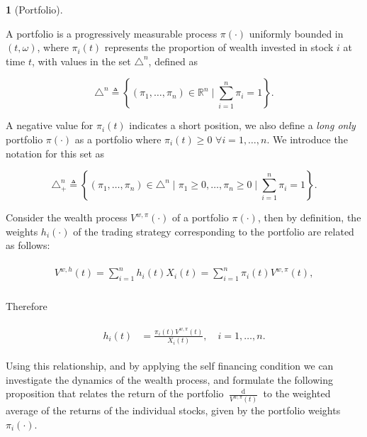 \documentclass[british]{amsart} \usepackage{lmodern}
\numberwithin{equation}{section} \numberwithin{figure}{section}
\theoremstyle{plain} \newtheorem{thm}{\protect\theoremname}[section]
\theoremstyle{definition} \newtheorem{defn}[thm]{\protect\definitionname}
\theoremstyle{plain} \newtheorem{assumption}[thm]{\protect\assumptionname}
\theoremstyle{plain} \newtheorem{lem}[thm]{\protect\lemmaname}
\theoremstyle{plain} \newtheorem{prop}[thm]{\protect\propositionname}
\theoremstyle{remark} \newtheorem{rem}[thm]{\protect\remarkname}
\theoremstyle{plain} \newtheorem{cor}[thm]{\protect\corollaryname}
\renewcommand{\d}[1]{\mathop{\mathrm{d}{#1}}}
\newcommand{\defeq}{\mathop{\triangleq}} \newcommand{\almostsurely}{\text{a.s.}}
\newcommand{\rangei}{i=1,\dots,n} \newcommand{\measure}{\mathbb{P}}
\newcommand{\V}{V^{w,\pi}}
\begin{document}
\begin{defn} [Portfolio]
  \label{def:portfolio}

  A portfolio is a progressively measurable process $\pi(\cdot)$ uniformly
  bounded in $(t,\omega)$, where $\pi_{i}(t)$ represents the proportion of wealth
  invested in stock $i$ at time $t$, with values in the set $\triangle^{n}$,
  defined as 

  \begin{equation*}
    \triangle^{n} \defeq 
    \left\{
          (\pi_{1}, \dots, \pi_{n}) \in \mathbb{R}^{n} 
          \mid
          \sum_{i=1}^{n} \pi_{i} = 1
    \right\}.
  \end{equation*}

  A negative value for $\pi_{i}(t)$ indicates a short position, we also define a
  \textit{long only} portfolio $\pi(\cdot)$ as a portfolio where $\pi_{i}(t) \ge
  0$ $\forall \rangei$. We introduce the notation for this set as

  \begin{equation*}
    \triangle_{+}^{n} \defeq 
    \left\{
          (\pi_{1}, \dots, \pi_{n}) \in \triangle^{n} 
          \mid
          \pi_{1} \ge 0, \dots, \pi_{n} \ge 0
          \mid
          \sum_{i=1}^{n} \pi_{i} = 1
    \right\}.
  \end{equation*}

\end{defn}

Consider the wealth process $\V(\cdot)$ of a portfolio $\pi(\cdot)$, then by
definition, the weights $h_{i}(\cdot)$ of the trading strategy corresponding to
the portfolio are related as follows:

\begin{gather}
  \begin{split}
    V^{w,h}(t) =\sum_{i=1}^{n} h_i(t)X_{i}(t) = \sum_{i=1}^{n}
                    \pi_{i}(t)V^{w,\pi}(t), \\
  \end{split}
\end{gather}

Therefore

\begin{gather}
  \begin{split}
    \label{eq:wealthinvestedbyportfolio}
    h_i(t) &= \frac{\pi_{i}(t)V^{w,\pi}(t)}{X_{i}(t)},
    \quad \rangei.
  \end{split}
\end{gather}

Using this relationship, and by applying the self financing condition we can
investigate the dynamics of the wealth process, and formulate the following
proposition that relates the return of the portfolio $\frac{\d{\V(t)}}{\V(t)}$
to the weighted average of the returns of the individual stocks, given by the
portfolio weights $\pi_{i}(\cdot)$.
\end{document}
